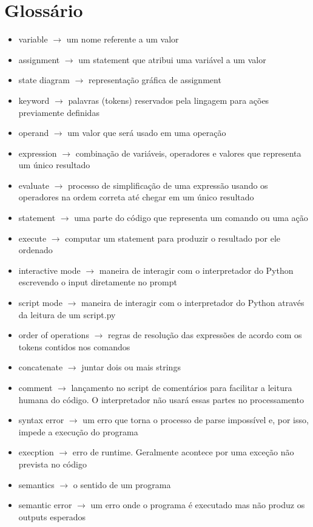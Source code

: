 \documentclass[a4paper,11pt]{book}
\begin{document}
\section{Glossário}
\begin{itemize}
	\item variable $ \rightarrow $ um nome referente a um valor
	\item assignment $ \rightarrow $ um statement que atribui uma variável a um valor
	\item state diagram $ \rightarrow $ representação gráfica de assignment
	\item keyword $ \rightarrow $ palavras (tokens) reservados pela lingagem para ações previamente definidas
	\item operand $ \rightarrow $ um valor que será usado em uma operação
	\item expression $ \rightarrow $ combinação de variáveis, operadores e valores que representa um único resultado
	\item evaluate $ \rightarrow $ processo de simplificação de uma expressão usando os operadores na ordem correta até chegar em um único resultado
	\item statement $ \rightarrow $ uma parte do código que representa um comando ou uma ação
	\item execute $ \rightarrow $ computar um statement para produzir o resultado por ele ordenado
	\item interactive mode $ \rightarrow $ maneira de interagir com o interpretador do Python escrevendo o input diretamente no prompt
	\item script mode $ \rightarrow $ maneira de interagir com o interpretador do Python através da leitura de um script.py
	\item order of operations $ \rightarrow $ regras de resolução das expressões de acordo com os tokens contidos nos comandos
	\item concatenate $ \rightarrow $ juntar dois ou mais strings
	\item comment $ \rightarrow $ lançamento no script de comentários para facilitar a leitura humana do código. O interpretador não usará essas partes no processamento
	\item syntax error $ \rightarrow $ um erro que torna o processo de parse impossível e, por isso, impede a execução do programa
	\item execption $ \rightarrow $ erro de runtime. Geralmente acontece por uma exceção não prevista no código
	\item semantics $ \rightarrow $ o sentido de um programa
	\item semantic error $ \rightarrow $ um erro onde o programa é executado mas não produz os outputs esperados
\end{itemize}
\end{document}
